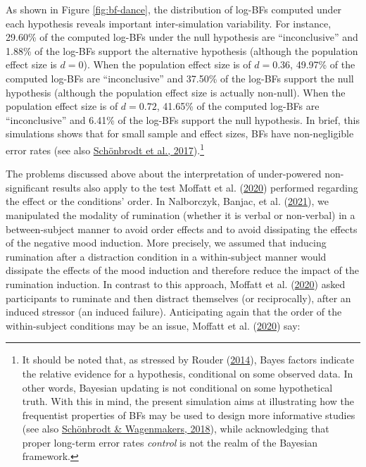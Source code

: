 \documentclass[
  man, donotrepeattitle,floatsintext]{apa6}
\begin{document}
As shown in Figure \ref{fig:bf-dance}, the distribution of log-BFs computed under each hypothesis reveals important inter-simulation variability. For instance, 29.60\% of the computed log-BFs under the null hypothesis are ``inconclusive'' and 1.88\% of the log-BFs support the alternative hypothesis (although the population effect size is \(d = 0\)). When the population effect size is of \(d = 0.36\), 49.97\% of the computed log-BFs are ``inconclusive'' and 37.50\% of the log-BFs support the null hypothesis (although the population effect size is actually non-null). When the population effect size is of \(d = 0.72\), 41.65\% of the computed log-BFs are ``inconclusive'' and 6.41\% of the log-BFs support the null hypothesis. In brief, this simulations shows that for small sample and effect sizes, BFs have non-negligible error rates (see also \protect\hyperlink{ref-schonbrodt_sequential_2017}{Schönbrodt et al., 2017}).\footnote{It should be noted that, as stressed by Rouder (\protect\hyperlink{ref-rouder_optional_2014}{2014}), Bayes factors indicate the relative evidence for a hypothesis, conditional on some observed data. In other words, Bayesian updating is not conditional on some hypothetical truth. With this in mind, the present simulation aims at illustrating how the frequentist properties of BFs may be used to design more informative studies (see also \protect\hyperlink{ref-schonbrodt_bayes_2018}{Schönbrodt \& Wagenmakers, 2018}), while acknowledging that proper long-term error rates \emph{control} is not the realm of the Bayesian framework.}

The problems discussed above about the interpretation of under-powered non-significant results also apply to the test Moffatt et al. (\protect\hyperlink{ref-moffatt_inner_2020}{2020}) performed regarding the effect or the conditions' order. In Nalborczyk, Banjac, et al. (\protect\hyperlink{ref-nalborczyk_dissociating_2021}{2021}), we manipulated the modality of rumination (whether it is verbal or non-verbal) in a between-subject manner to avoid order effects and to avoid dissipating the effects of the negative mood induction. More precisely, we assumed that inducing rumination after a distraction condition in a within-subject manner would dissipate the effects of the mood induction and therefore reduce the impact of the rumination induction. In contrast to this approach, Moffatt et al. (\protect\hyperlink{ref-moffatt_inner_2020}{2020}) asked participants to ruminate and then distract themselves (or reciprocally), after an induced stressor (an induced failure). Anticipating again that the order of the within-subject conditions may be an issue, Moffatt et al. (\protect\hyperlink{ref-moffatt_inner_2020}{2020}) say:
\end{document}
